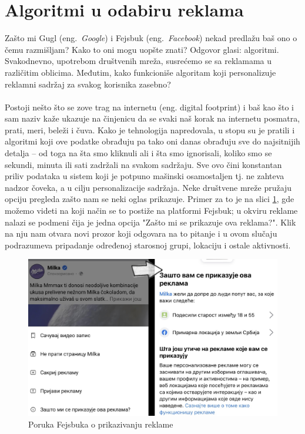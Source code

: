 \documentclass[a4paper]{article}
\begin{document}
	\section{Algoritmi u odabiru reklama}
	\label{sec:algoritmi}
	Zašto mi Gugl (eng.~{\em Google}) i Fejsbuk (eng.~{\em Facebook}) nekad predlažu baš ono o čemu razmišljam? Kako to oni mogu uopšte znati? Odgovor glasi: algoritmi. Svakodnevno, upotrebom društvenih mreža, susrećemo se sa reklamama u različitim oblicima. Međutim, 		kako funkcioniše algoritam koji personalizuje reklamni sadržaj za svakog korisnika zasebno?\\ \\
	Postoji nešto što se zove trag na internetu (eng. digital footprint) i baš kao što i sam naziv kaže ukazuje na činjenicu da se svaki naš korak na internetu posmatra, prati, meri, beleži i čuva. Kako je tehnologija napredovala, u stopu su je pratili i algoritmi koji ove podatke 		obrađuju pa tako oni danas obrađuju sve do najsitnijih detalja – od toga na šta smo kliknuli ali i šta smo ignorisali, koliko smo se sekundi, minuta ili sati zadržali na svakom sadržaju. Sve ovo čini konstantan priliv podataka u sistem koji je potpuno mašinski osamostaljen tj. ne 		zahteva nadzor čoveka, a u cilju personalizacije sadržaja. Neke društvene mreže pružaju opciju pregleda zašto nam se neki oglas prikazuje. Primer za to je na slici \ref{fig:zastoreklama}, gde možemo videti na koji način se to postiže na platformi Fejsbuk; u okviru reklame nalazi se podmeni čija je jedna opcija "Zašto mi se prikazuje ova reklama?". Klik na nju nam otvara novi prozor koji odgovara na to pitanje i u ovom slučaju podrazumeva pripadanje određenoj starosnoj grupi, lokaciju i ostale aktivnosti. \\
	\begin{figure}[h!]
		\begin{center}
			\includegraphics[scale=0.1]{zastoreklama.jpg}
		\end{center}
		\caption{Poruka Fejsbuka o prikazivanju reklame}
		\label{fig:zastoreklama}
	\end{figure}\\
\end{document}
